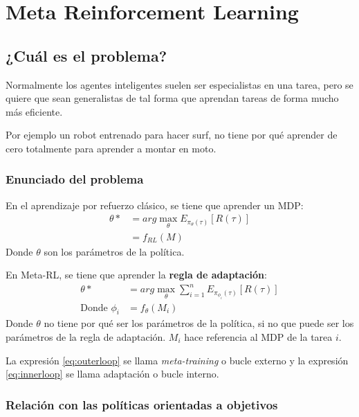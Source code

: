 \chapter{Meta Reinforcement Learning}%
\label{cha:meta_learning}

\section{¿Cuál es el problema?}%
\label{sec:_cuál_es_el_problema_}

Normalmente los agentes inteligentes suelen ser especialistas en una tarea, pero se quiere que
sean generalistas de tal forma que aprendan tareas de forma mucho más eficiente.

Por ejemplo un robot entrenado para hacer surf, no tiene por qué aprender de cero totalmente para
aprender a montar en moto.

\subsection{Enunciado del problema}%
\label{sub:enunciado_del_problema}

En el aprendizaje por refuerzo clásico, se tiene que aprender un MDP:
\begin{align}
    \theta*&=arg\max_\theta E_{\pi_\theta(\tau)}[R(\tau)]\\
           &=f_{RL}(M)
\end{align}
Donde $\theta$ son los parámetros de la política.

En Meta-RL, se tiene que aprender la \textbf{regla de adaptación}:
\begin{align}
    \label{eq:outerloop}
    \theta*&=arg\max_\theta \sum_{i=1}^n E_{\pi_{\phi_i}(\tau)}[R(\tau)]\\
    \label{eq:innerloop}
    \textrm{Donde } \phi_i&=f_\theta(M_i)
\end{align}
Donde $\theta$ no tiene por qué ser los parámetros de la política, si no que puede ser los
parámetros de la regla de adaptación. $M_i$ hace referencia al MDP de la tarea $i$.

La expresión \ref{eq:outerloop} se llama \textit{meta-training} o bucle externo y la
expresión \ref{eq:innerloop} se llama adaptación o bucle interno.

\subsection{Relación con las políticas orientadas a objetivos}%
\label{sub:relación_con_las_políticas_orientadas_a_objetivos}

